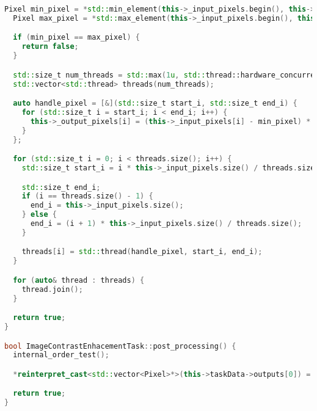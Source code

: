 \documentclass{report}
\begin{document}
\begin{lstlisting}[language=C++,caption=STL версия]
  Pixel min_pixel = *std::min_element(this->_input_pixels.begin(), this->_input_pixels.end());
  Pixel max_pixel = *std::max_element(this->_input_pixels.begin(), this->_input_pixels.end());

  if (min_pixel == max_pixel) {
    return false;
  }

  std::size_t num_threads = std::max(1u, std::thread::hardware_concurrency());
  std::vector<std::thread> threads(num_threads);

  auto handle_pixel = [&](std::size_t start_i, std::size_t end_i) {
    for (std::size_t i = start_i; i < end_i; i++) {
      this->_output_pixels[i] = (this->_input_pixels[i] - min_pixel) * 255 / (max_pixel - min_pixel);
    }
  };

  for (std::size_t i = 0; i < threads.size(); i++) {
    std::size_t start_i = i * this->_input_pixels.size() / threads.size();

    std::size_t end_i;
    if (i == threads.size() - 1) {
      end_i = this->_input_pixels.size();
    } else {
      end_i = (i + 1) * this->_input_pixels.size() / threads.size();
    }

    threads[i] = std::thread(handle_pixel, start_i, end_i);
  }

  for (auto& thread : threads) {
    thread.join();
  }

  return true;
}

bool ImageContrastEnhacementTask::post_processing() {
  internal_order_test();

  *reinterpret_cast<std::vector<Pixel>*>(this->taskData->outputs[0]) = this->_output_pixels;

  return true;
}
\end{lstlisting}
\end{document}
